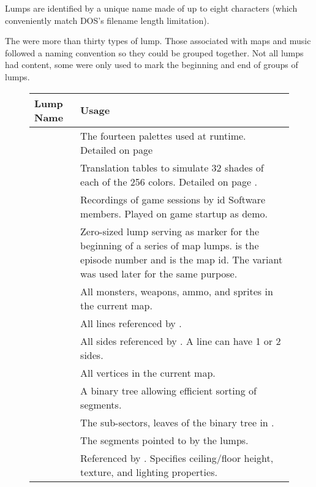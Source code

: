 Lumps are identified by a unique name made of up to eight characters (which conveniently match DOS's filename length limitation).\\
\par
{}
\par
The were more than thirty types of lump. Those associated with maps and music followed a naming convention so they could be grouped together. Not all lumps had content, some were only used to mark the beginning and end of groups of lumps.
\pagebreak

\begin{figure}[H]
\centering  
\begin{tabularx}{\textwidth}{ L{0.2}  L{0.8}}
  \toprule
  \textbf{Lump Name} &  \textbf{Usage} \\
   
  \toprule 
   & The fourteen palettes used at runtime. Detailed on page \pageref{label_palettes} \\
   & Translation tables to simulate 32 shades of each of the 256 colors. Detailed on page \pageref{diminishedlightning}. \\
   &  Recordings of game sessions by id Software members. Played on game startup as demo.\\
  \toprule
   & Zero-sized lump serving as marker for the beginning of a series of map lumps.  is the episode number and  is the map id. The  variant was used later for the same purpose.\\
   & All monsters, weapons, ammo, and sprites in the current map.\\
   & All lines referenced by .\\
   & All sides referenced by . A line can have 1 or 2 sides.\\
   & All vertices in the current map.\\
   & A binary tree allowing efficient sorting of segments. \\
   &  The sub-sectors, leaves of the binary tree in .  \\
   &  The segments pointed to by the  lumps.\\
   &  Referenced by . Specifies ceiling/floor height, texture, and lighting properties.\\
  

\end{tabularx}
\end{figure}
